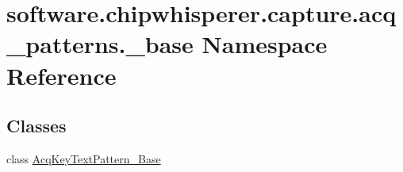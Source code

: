 \hypertarget{namespacesoftware_1_1chipwhisperer_1_1capture_1_1acq__patterns_1_1__base}{}\section{software.\+chipwhisperer.\+capture.\+acq\+\_\+patterns.\+\_\+base Namespace Reference}
\label{namespacesoftware_1_1chipwhisperer_1_1capture_1_1acq__patterns_1_1__base}
\subsection*{Classes}
\begin{DoxyCompactItemize}
\item 
class \hyperlink{classsoftware_1_1chipwhisperer_1_1capture_1_1acq__patterns_1_1__base_1_1AcqKeyTextPattern__Base}{Acq\+Key\+Text\+Pattern\+\_\+\+Base}
\end{DoxyCompactItemize}

